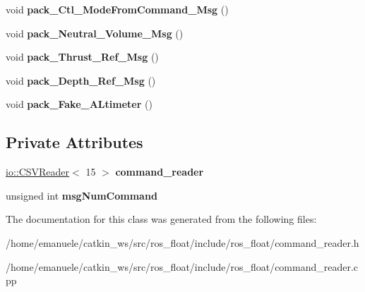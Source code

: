 \begin{DoxyCompactItemize}
void {\bfseries pack\+\_\+\+Ctl\+\_\+\+Mode\+From\+Command\+\_\+\+Msg} ()
\item 
\mbox{\label{classCOMMAND__reader_a537401ac7bacba551e48dd03c24657cf}} 
void {\bfseries pack\+\_\+\+Neutral\+\_\+\+Volume\+\_\+\+Msg} ()
\item 
\mbox{\label{classCOMMAND__reader_a0b3e5e476b7513308c8439d1fb5ea25c}} 
void {\bfseries pack\+\_\+\+Thrust\+\_\+\+Ref\+\_\+\+Msg} ()
\item 
\mbox{\label{classCOMMAND__reader_a52e419a1b839ceebc8d10af80b6c4988}} 
void {\bfseries pack\+\_\+\+Depth\+\_\+\+Ref\+\_\+\+Msg} ()
\item 
\mbox{\label{classCOMMAND__reader_a055fb22da6f6f9a770c2c5ef5e7dbf16}} 
void {\bfseries pack\+\_\+\+Fake\+\_\+\+A\+Ltimeter} ()
\end{DoxyCompactItemize}
\subsection*{Private Attributes}
\begin{DoxyCompactItemize}
\item 
\mbox{\label{classCOMMAND__reader_a10852e59a551516f12c9fac9f5c62bda}} 
\hyperlink{classio_1_1CSVReader}{io\+::\+C\+S\+V\+Reader}$<$ 15 $>$ {\bfseries command\+\_\+reader}
\item 
\mbox{\label{classCOMMAND__reader_a80ebeaad902f4058510524210652478f}} 
unsigned int {\bfseries msg\+Num\+Command}
\end{DoxyCompactItemize}


The documentation for this class was generated from the following files\+:\begin{DoxyCompactItemize}
\item 
/home/emanuele/catkin\+\_\+ws/src/ros\+\_\+float/include/ros\+\_\+float/command\+\_\+reader.\+h\item 
/home/emanuele/catkin\+\_\+ws/src/ros\+\_\+float/include/ros\+\_\+float/command\+\_\+reader.\+cpp\end{DoxyCompactItemize}
